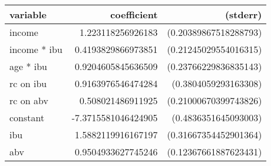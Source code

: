 \begin{tabular}{lrr}
\textbf{variable}&\textbf{coefficient}&\textbf{(stderr)}\\
\hline

income&1.223118256926183&(0.20389867518288793)\\
income * ibu&0.4193829866973851&(0.21245029554016315)\\
age * ibu&0.9204605845636509&(0.23766229836835143)\\
rc on ibu&0.9163976546474284&(0.3804059293163308)\\
rc on abv&0.508021486911925&(0.21000670399743826)\\
constant&-7.3715581046424905&(0.4836351645093003)\\
ibu&1.5882119916167197&(0.31667354452901364)\\
abv&0.9504933627745246&(0.12367661887623431)\\
\end{tabular}

